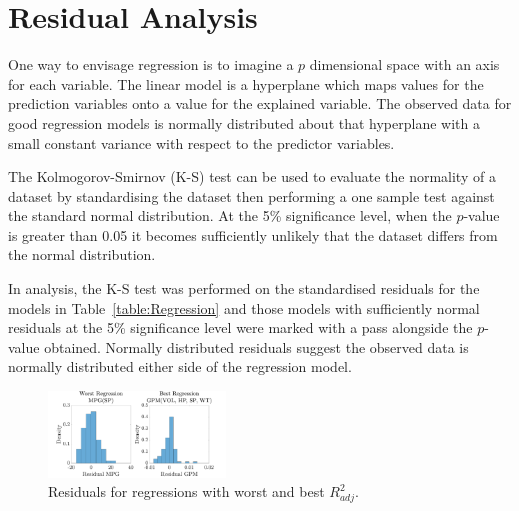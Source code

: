 \documentclass[a4paper,10pt,twocolumn]{article}
\begin{document}
\section{Residual Analysis}

One way to envisage regression is to imagine a $p$ dimensional space with 
an axis for each variable. The linear model is a hyperplane which maps values 
for the prediction variables onto a value for the explained variable. The 
observed data for good regression models is normally distributed about that 
hyperplane with a small constant variance with respect to the predictor 
variables.

The Kolmogorov-Smirnov (K-S) test can be used to evaluate the normality of a 
dataset by standardising the dataset then performing a one sample test against 
the standard normal distribution. At the 5\% significance level, when the 
$p$-value is greater than 0.05 it becomes sufficiently unlikely that the 
dataset differs from the normal distribution.

In analysis, the K-S test was performed on the standardised residuals for the 
models in Table~\ref{table:Regression} and those models with sufficiently 
normal residuals at the 5\% significance level were marked with a pass 
alongside the $p$-value obtained. Normally distributed residuals suggest the 
observed data is normally distributed either side of the regression model.

\begin{figure}[h]
    \centering
    \includegraphics[width=0.42\textwidth]{Residuals}
    \caption{Residuals for regressions with worst and best $R^2_{adj}$.}
    \label{fig:Residuals}
\end{figure}

\printbibliography

\clearpage
\end{document}
